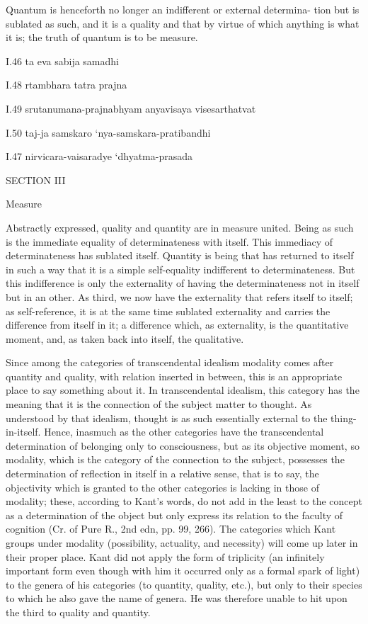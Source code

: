 Quantum is henceforth no longer an indifferent or external determina-
tion but is sublated as such, and it is a quality and that by virtue of which
anything is what it is; the truth of quantum is to be measure.

I.46
ta eva sabija samadhi

I.48
rtambhara tatra prajna

I.49
srutanumana-prajnabhyam anyavisaya visesarthatvat

I.50
taj-ja samskaro ‘nya-samskara-pratibandhi

I.47
nirvicara-vaisaradye ‘dhyatma-prasada

SECTION III

Measure

Abstractly expressed, quality and quantity are in measure united.
Being as such is the immediate equality of determinateness with itself.
This immediacy of determinateness has sublated itself.
Quantity is being that has returned to itself in such a way that it is
a simple self-equality indifferent to determinateness.
But this indifference is only the externality of having
the determinateness not in itself but in an other.
As third, we now have the externality that refers itself to itself;
as self-reference, it is at the same time sublated externality and
carries the difference from itself in it;
a difference which, as externality, is the quantitative moment, and,
as taken back into itself, the qualitative.

Since among the categories of transcendental idealism modality comes
after quantity and quality, with relation inserted in between,
this is an appropriate place to say something about it.
In transcendental idealism, this category has the meaning that
it is the connection of the subject matter to thought.
As understood by that idealism, thought is as such essentially
external to the thing-in-itself.
Hence, inasmuch as the other categories have the
transcendental determination of belonging only to consciousness,
but as its objective moment,
so modality, which is the category of the connection to the subject,
possesses the determination of reflection in itself in a relative sense,
that is to say, the objectivity which is granted to the other categories
is lacking in those of modality;
these, according to Kant’s words, do not add in the least to
the concept as a determination of the object but only express
its relation to the faculty of cognition
(Cr. of Pure R., 2nd edn, pp. 99, 266).
The categories which Kant groups under modality
(possibility, actuality, and necessity)
will come up later in their proper place.
Kant did not apply the form of triplicity
(an infinitely important form even though
with him it occurred only as a formal spark of light)
to the genera of his categories (to quantity, quality, etc.),
but only to their species to which he also gave the name of genera.
He was therefore unable to hit upon the third to quality and quantity.

